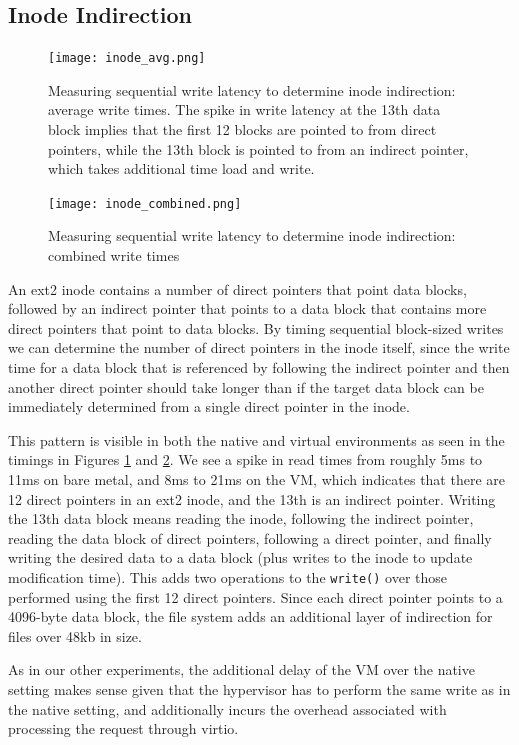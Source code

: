\documentclass[letterpaper,twocolumn,10pt]{article}
\begin{document}
\subsection{Inode Indirection}
\begin{figure}[!ht]
\texttt{[image: inode\_avg.png]}
\caption{Measuring sequential write latency to determine inode indirection: average write times. The spike in write latency at the 13th data block implies that the first 12 blocks are pointed to from direct pointers, while the 13th block is pointed to from an indirect pointer, which takes additional time load and write.}
\label{fig:inode_avg}
\end{figure}
\begin{figure}[!ht]
\texttt{[image: inode\_combined.png]}
\caption{Measuring sequential write latency to determine inode indirection: combined write times}
\label{fig:inode_combined}
\end{figure}
An ext2 inode contains a number of direct pointers that point data blocks, followed by an indirect pointer that points to a data block that contains more direct pointers that point to data blocks. By timing sequential block-sized writes we can determine the number of direct pointers in the inode itself, since the write time for a data block that is referenced by following the indirect pointer and then another direct pointer should take longer than if the target data block can be immediately determined from a single direct pointer in the inode. 

This pattern is visible in both the native and virtual environments as seen in the timings in Figures \ref{fig:inode_avg} and \ref{fig:inode_combined}. We see a spike in read times from roughly 5ms to 11ms on bare metal, and 8ms to 21ms on the VM, which indicates that there are 12 direct pointers in an ext2 inode, and the 13th is an indirect pointer. Writing the 13th data block means reading the inode, following the indirect pointer, reading the data block of direct pointers, following a direct pointer, and finally writing the desired data to a data block (plus writes to the inode to update modification time). This adds two operations to the \verb~write()~ over those performed using the first 12 direct pointers. Since each direct pointer points to a 4096-byte data block, the file system adds an additional layer of indirection for files over 48kb in size.

As in our other experiments, the additional delay of the VM over the native setting makes sense given that the hypervisor has to perform the same write as in the native setting, and additionally incurs the overhead associated with processing the request through virtio.
\end{document}
